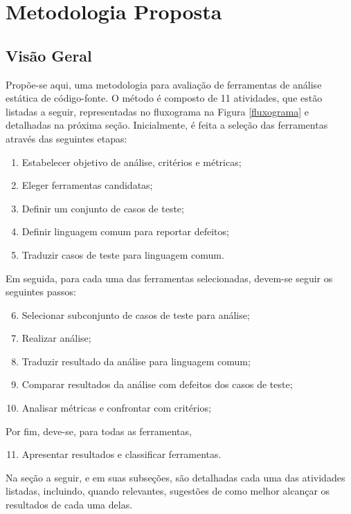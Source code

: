 \chapter{Metodologia Proposta}\label{metodologia_proposta}

\section{Visão Geral}\label{metodologia_proposta:visao_geral}

Propõe-se aqui, uma metodologia para avaliação de ferramentas de análise estática de código-fonte. O método é composto de 11 atividades, que estão listadas a seguir, representadas no fluxograma na Figura \ref{fluxograma} e detalhadas na próxima seção. Inicialmente, é feita a seleção das ferramentas através das seguintes etapas:
\begin{enumerate}
  \item Estabelecer objetivo de análise, critérios e métricas;
  \item Eleger ferramentas candidatas;
  \item Definir um conjunto de casos de teste;
  \item Definir linguagem comum para reportar defeitos;
  \item Traduzir casos de teste para linguagem comum.
\end{enumerate}
Em seguida, para cada uma das ferramentas selecionadas, devem-se seguir os seguintes passos:
\begin{enumerate}
    \setcounter{enumi}{5}
  \item Selecionar subconjunto de casos de teste para análise;
  \item Realizar análise;
  \item Traduzir resultado da análise para linguagem comum;
  \item Comparar resultados da análise com defeitos dos casos de  teste;
  \item Analisar métricas e confrontar com critérios;
\end{enumerate}
Por fim, deve-se, para todas as ferramentas,
\begin{enumerate}
    \setcounter{enumi}{10}
  \item Apresentar resultados e classificar ferramentas.
\end{enumerate}

%

Na seção a seguir,  e em suas subseções, são detalhadas cada uma das atividades listadas, incluindo, quando relevantes, sugestões de como melhor alcançar os resultados de cada uma delas.

